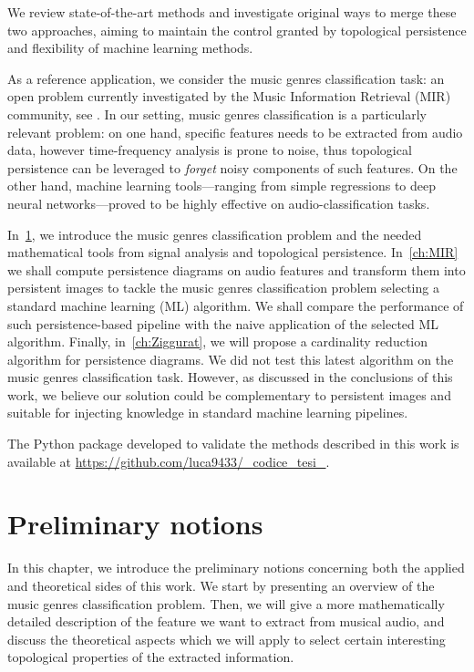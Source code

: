 \documentclass[english, LaM, oneside, noexaminfo]{sapthesis}
\begin{document}
We review state-of-the-art methods and investigate original ways to merge these two approaches, aiming to maintain the control granted by topological persistence and flexibility of machine learning methods. 

As a reference application, we consider the music genres classification task: an open problem currently investigated by the Music Information Retrieval (MIR) community, see \cite{downie2003music}. In our setting, music genres classification is a particularly relevant problem: on one hand, specific features needs to be extracted from audio data, however time-frequency analysis is prone to noise, thus topological persistence can be leveraged to \textit{forget} noisy components of such features. On the other hand, machine learning tools---ranging from simple regressions to deep neural networks---proved to be highly effective on audio-classification tasks.

In~\cref{chapter 2}, we introduce the music genres classification problem and the needed mathematical tools from signal analysis and topological persistence.
In~\cref{ch:MIR} we shall compute persistence diagrams on audio features and transform them into persistent images to tackle the music genres classification problem selecting a standard machine learning (ML) algorithm. We shall compare the performance of such persistence-based pipeline with the naive application of the selected ML algorithm.
Finally, in~\cref{ch:Ziggurat}, we will propose a cardinality reduction algorithm for persistence diagrams. We did not test this latest algorithm on the music genres classification task. However, as discussed in the conclusions of this work, we believe our solution could be complementary to persistent images and suitable for injecting knowledge in standard machine learning pipelines.

The Python package developed to validate the methods described in this work is available at \href{https://github.com/luca9433/_codice_tesi_}{https://github.com/luca9433/_codice_tesi_}.

\chapter{Preliminary notions}\label{chapter 2}

In this chapter, we introduce the preliminary notions concerning both the applied and theoretical sides of this work. We start by presenting an overview of the music genres classification problem. Then, we will give a more mathematically detailed description of the feature we want to extract from musical audio, and discuss the theoretical aspects which we will apply to select certain interesting topological properties of the extracted information.
\end{document}
